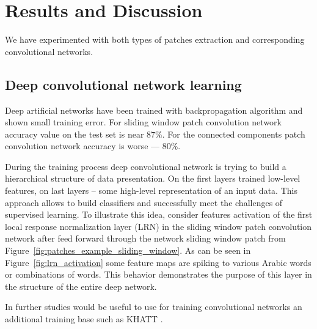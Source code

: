 \documentclass[conference,a4paper]{ieeetran}
\begin{document}

\section{Results and Discussion}
\label{sec:results_and_description}

We have experimented with both types of patches extraction and corresponding convolutional networks. 

\subsection{Deep convolutional network learning}


Deep artificial networks have been trained with backpropagation algorithm \cite{CNN} and shown small training error. For sliding window patch convolution network accuracy value on the test set is near $87 \%$. For the connected components patch convolution network accuracy is worse --- $80 \%$. 

During the training process deep convolutional network is trying to build a hierarchical structure of data presentation. On the first layers trained low-level features, on last layers -- some high-level representation of an input data. This approach allows to build classifiers and successfully meet the challenges of supervised learning. To illustrate this idea, consider features activation of the first local response normalization layer (LRN) in the sliding window patch convolution network after feed forward through the network sliding window patch from Figure~\ref{fig:patches_example_sliding_window}. As can be seen in Figure~\ref{fig:lrn_activation} some feature maps are spiking to various Arabic words or combinations of words. This behavior demonstrates the purpose of this layer in the structure of the entire deep network.

{\color{red} In further studies would be useful to use for training convolutional networks an additional training base such as KHATT \cite{khatt}.}
\end{document}
